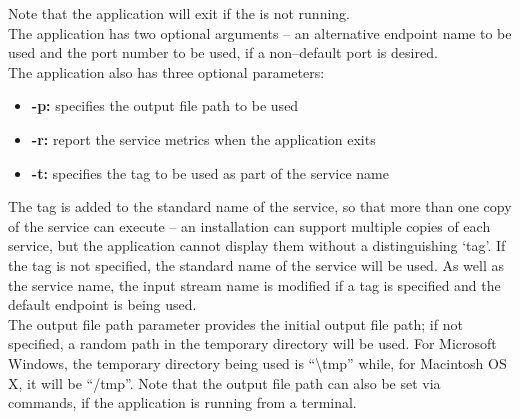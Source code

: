 Note that the application will exit if the
 is not running.\\

The application has two optional arguments -- an alternative endpoint name to be used and
the port number to be used, if a non--default port is desired.\\

The application also has three optional parameters:
\begin{itemize}
\item \textbf{-p:} specifies the output file path to be used
\item \textbf{-r:} report the service metrics when the application exits
\item \textbf{-t:} specifies the tag to be used as part of the service name
\end{itemize}
The tag is added to the standard name of the service, so that more than one copy of the
service can execute -- an \mplusm{} installation can support multiple copies of each
 service, but the 
application cannot display them without a distinguishing `tag'.
If the tag is not specified, the standard name of the service will be used.
As well as the service name, the input stream name is modified if a tag is specified and
the default endpoint is being used.\\

The output file path parameter provides the initial output file path; if not specified, a
random path in the temporary directory will be used.
For Microsoft Windows, the temporary directory being used is ``\textbackslash{}tmp''
while, for Macintosh OS X, it will be ``/tmp''.
Note that the output file path can also be set via commands, if the application is
running from a terminal.\\


